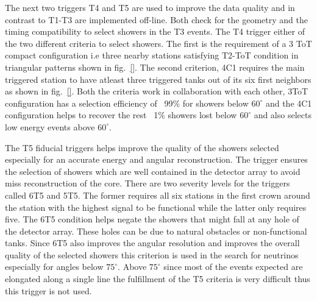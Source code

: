 The next two triggers T4 and T5 are used to improve the data quality and in contrast to T1-T3 are implemented off-line. Both check for the geometry and the timing compatibility to select showers in the T3 events. The T4 trigger either of the two different criteria to select showers. The first is the requirement of a 3 ToT compact configuration i.e three nearby stations satisfying T2-ToT condition in triangular patterns shown in fig.~\ref{}. The second criterion, 4C1 requires the main triggered station to have atleast three triggered tanks out of its six first neighbors as shown in fig.~\ref{}. Both the criteria work in collaboration with each other, 3ToT configuration has a selection efficiency of ~99\% for showers below $60^{\circ}$ and the 4C1 configuration helps to recover the rest ~1\% showers lost below $60^{\circ}$ and also selects low energy events above $60^{\circ}$.

The T5 fiducial triggers helps improve the quality of the showers selected especially for an accurate energy and angular reconstruction. The trigger ensures the selection of showers which are well contained in the detector array to avoid miss reconstruction of the core. There are two severity levels for the triggers called 6T5 and 5T5. The former requires all six stations in the first crown around the station with the highest signal to be functional while the latter only requires five. The 6T5 condition helps negate the showers that might fall at any hole of the detector array. These holes can be due to natural obstacles or non-functional tanks. Since 6T5 also improves the angular resolution and improves the overall quality of the selected showers this criterion is used in the search for neutrinos especially for angles below $75^{\circ}$. Above $75^{\circ}$ since most of the events expected are elongated along a single line the fulfillment of the T5 criteria is very difficult thus this trigger is not used. 

